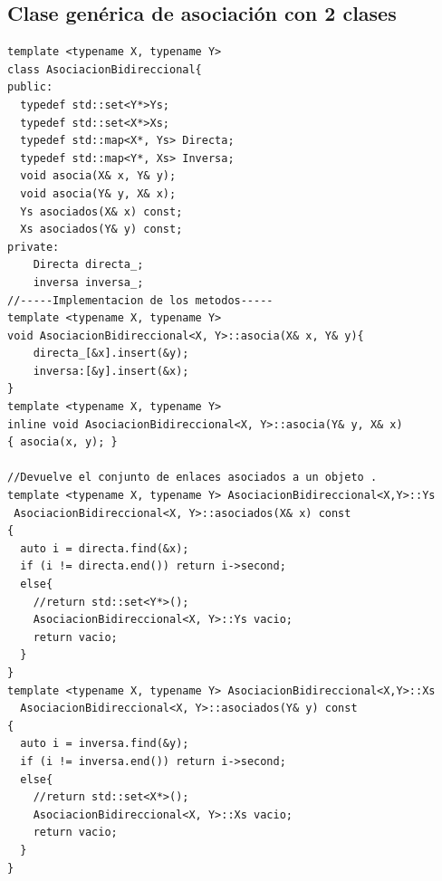 \newpage
\subsection{Clase genérica de asociación con 2 clases}
\begin{center}
	\begin{lstlisting}[frame=single]
template <typename X, typename Y>
class AsociacionBidireccional{
public:
  typedef std::set<Y*>Ys;
  typedef std::set<X*>Xs;
  typedef std::map<X*, Ys> Directa;
  typedef std::map<Y*, Xs> Inversa;
  void asocia(X& x, Y& y);
  void asocia(Y& y, X& x);
  Ys asociados(X& x) const;
  Xs asociados(Y& y) const;
private:
    Directa directa_;
    inversa inversa_;
//-----Implementacion de los metodos-----
template <typename X, typename Y>
void AsociacionBidireccional<X, Y>::asocia(X& x, Y& y){
    directa_[&x].insert(&y);
    inversa:[&y].insert(&x);
}
template <typename X, typename Y>
inline void AsociacionBidireccional<X, Y>::asocia(Y& y, X& x)
{ asocia(x, y); }

//Devuelve el conjunto de enlaces asociados a un objeto .
template <typename X, typename Y> AsociacionBidireccional<X,Y>::Ys
 AsociacionBidireccional<X, Y>::asociados(X& x) const
{
  auto i = directa.find(&x);
  if (i != directa.end()) return i->second;
  else{
    //return std::set<Y*>();
    AsociacionBidireccional<X, Y>::Ys vacio;
    return vacio;
  }
} 
template <typename X, typename Y> AsociacionBidireccional<X,Y>::Xs
  AsociacionBidireccional<X, Y>::asociados(Y& y) const
{
  auto i = inversa.find(&y);
  if (i != inversa.end()) return i->second;
  else{
    //return std::set<X*>();
    AsociacionBidireccional<X, Y>::Xs vacio;
    return vacio;
  }
}
\end{lstlisting}
\end{center}
\newpage
